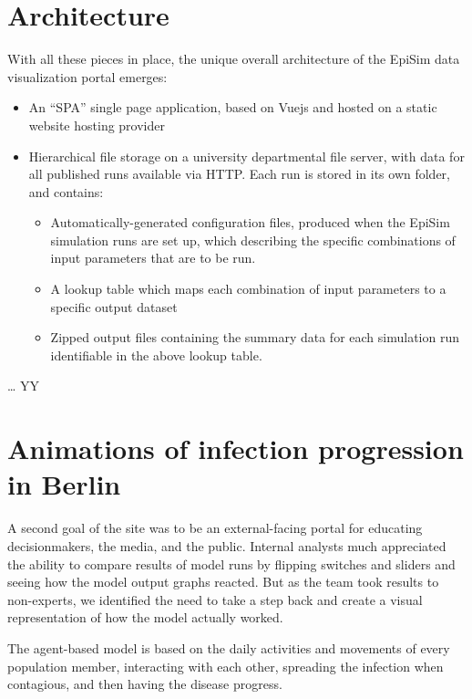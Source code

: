 \hypertarget{architecture}{%
\section{Architecture}\label{architecture}}

With all these pieces in place, the unique overall architecture of the EpiSim data visualization portal emerges:

\begin{itemize}
\item
  An ``SPA'' single page application, based on Vuejs and hosted on a
  static website hosting provider
\item
  Hierarchical file storage on a university departmental file server,
  with data for all published runs available via HTTP. Each run is
  stored in its own folder, and contains:

  \begin{itemize}
  \item
    Automatically-generated configuration files, produced when the
    EpiSim simulation runs are set up, which describing the specific
    combinations of input parameters that are to be run.
  \item
    A lookup table which maps each combination of input parameters to a
    specific output dataset
  \item
    Zipped output files containing the summary data for each simulation
    run identifiable in the above lookup table.
  \end{itemize}
\end{itemize}

\ldots{} YY

\hypertarget{animations-of-infection-progression-in-berlin}{%
\section{Animations of infection progression in Berlin}\label{animations-of-infection-progression-in-berlin}}

A second goal of the site was to be an external-facing portal for educating decisionmakers, the media, and the public. Internal analysts much appreciated the ability to compare results of model runs by flipping switches and sliders and seeing how the model output graphs reacted. But as the team took results to non-experts, we identified the need to take a step back and create a visual representation of how the model actually worked.

The agent-based model is based on the daily activities and movements of every population member, interacting with each other, spreading the infection when contagious, and then having the disease progress.

